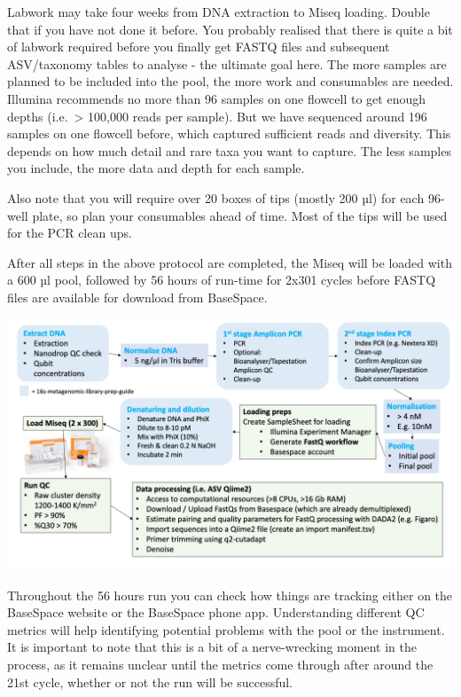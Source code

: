 \documentclass[
]{book}
\begin{document}
Labwork may take four weeks from DNA extraction to Miseq loading. Double that if you have not done it before. You probably realised that there is quite a bit of labwork required before you finally get FASTQ files and subsequent ASV/taxonomy tables to analyse - the ultimate goal here. The more samples are planned to be included into the pool, the more work and consumables are needed. Illumina recommends no more than 96 samples on one flowcell to get enough depths (i.e.~\textgreater{} 100,000 reads per sample). But we have sequenced around 196 samples on one flowcell before, which captured sufficient reads and diversity. This depends on how much detail and rare taxa you want to capture. The less samples you include, the more data and depth for each sample.

Also note that you will require over 20 boxes of tips (mostly 200 µl) for each 96-well plate, so plan your consumables ahead of time. Most of the tips will be used for the PCR clean ups.

After all steps in the above protocol are completed, the Miseq will be loaded with a 600 µl pool, followed by 56 hours of run-time for 2x301 cycles before FASTQ files are available for download from BaseSpace.

\includegraphics{./img/16s-library-prep-overview.png}

Throughout the 56 hours run you can check how things are tracking either on the BaseSpace website or the BaseSpace phone app. Understanding different QC metrics will help identifying potential problems with the pool or the instrument. It is important to note that this is a bit of a nerve-wrecking moment in the process, as it remains unclear until the metrics come through after around the 21st cycle, whether or not the run will be successful.\\
\strut \\
\end{document}
